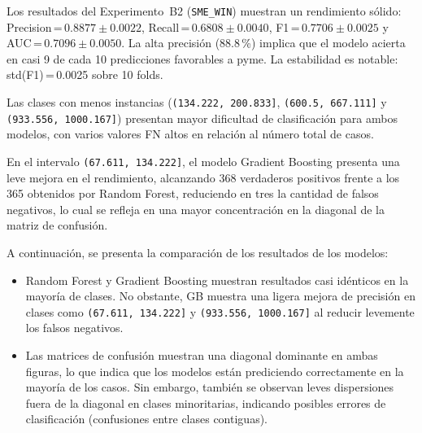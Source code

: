 \documentclass[a4paper,fleqn]{cas-sc}
\begin{document}
Los resultados del Experimento~B2 (\texttt{SME\_WIN}) muestran un rendimiento sólido: Precision\,=\,$0.8877 \pm 0.0022$, Recall\,=\,$0.6808 \pm 0.0040$, F1\,=\,$0.7706 \pm 0.0025$ y AUC\,=\,$0.7096 \pm 0.0050$. La alta precisión (88.8\,\%) implica que el modelo acierta en casi 9 de cada 10 predicciones favorables a pyme. La estabilidad es notable: std(F1)\,=\,0.0025 sobre 10 folds.

Las clases con menos instancias (\texttt{(134.222, 200.833]}, \texttt{(600.5, 667.111]} y \texttt{(933.556, 1000.167]}) presentan mayor dificultad de clasificación para ambos modelos, con varios valores FN altos en relación al número total de casos.

En el intervalo \texttt{(67.611, 134.222]}, el modelo Gradient Boosting presenta una leve mejora en el rendimiento, alcanzando 368 verdaderos positivos frente a los 365 obtenidos por Random Forest, reduciendo en tres la cantidad de falsos negativos, lo cual se refleja en una mayor concentración en la diagonal de la matriz de confusión.


A continuación, se presenta la comparación de los resultados de los modelos:

\begin{itemize}
	\item Random Forest y Gradient Boosting muestran resultados casi idénticos en la mayoría de clases. No obstante, GB muestra una ligera mejora de precisión en clases como \texttt{(67.611, 134.222]} y \texttt{(933.556, 1000.167]} al reducir levemente los falsos negativos.
	
	\item Las matrices de confusión muestran una diagonal dominante en ambas figuras, lo que indica que los modelos están prediciendo correctamente en la mayoría de los casos. Sin embargo, también se observan leves dispersiones fuera de la diagonal en clases minoritarias, indicando posibles errores de clasificación (confusiones entre clases contiguas).
\end{itemize}
\end{document}
